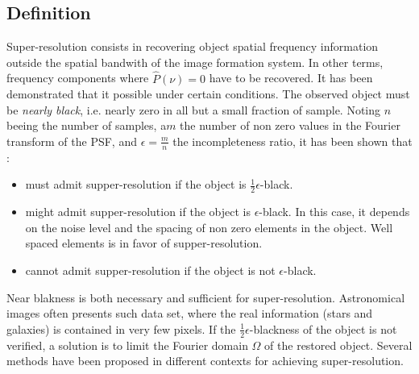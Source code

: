 \documentclass[11pt,a4paper]{article}
\begin{document}
\subsection{Definition}
Super-resolution consists in recovering object spatial frequency information 
outside the spatial bandwith of the image formation system. In other terms,
frequency components where $\hat{P}(\nu)=0$ have to be recovered. 
It has been demonstrated \cite{rest:donoho92} that it possible under certain
conditions. The observed object must be {\em nearly black}, i.e. nearly zero
in all but a small fraction of sample. Noting $n$ beeing the number of samples,
a$m$ the number of non zero values in the Fourier transform of the PSF,
and $\epsilon = \frac{m}{n}$ the incompleteness ratio,
it has been shown that \cite{rest:donoho92} :
\begin{itemize}
\item must admit supper-resolution if the object is $\frac{1}{2} \epsilon$-black.
\item might admit supper-resolution if the object is  $\epsilon$-black. In this
case, it depends on the noise level and the spacing of non zero elements
in the object. Well spaced elements is in favor of supper-resolution.
\item cannot admit supper-resolution if the object is not $\epsilon$-black. 
\end{itemize}
Near blakness is both necessary and sufficient for super-resolution. 
Astronomical images often presents such data set, where the real information
(stars and galaxies) is contained in very few pixels. 
If the $\frac{1}{2} \epsilon$-blackness of the object is not verified, a 
solution is to limit the Fourier domain $\Omega$ of the restored object.
Several methods have been proposed in different contexts for achieving
super-resolution.
\end{document}

